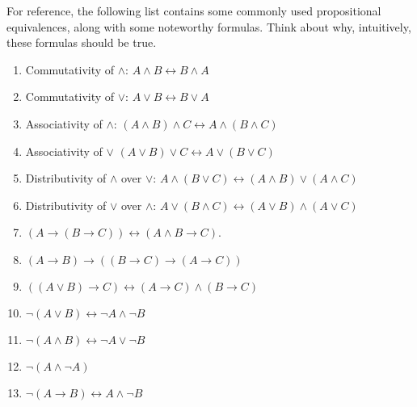 \documentclass[letterpaper,10pt,english]{sphinxmanual}
\begin{document}
\sphinxAtStartPar
For reference, the following list contains some commonly used propositional equivalences, along with some noteworthy formulas. Think about why, intuitively, these formulas should be true.
\begin{enumerate}
%
\item {} 
\sphinxAtStartPar
Commutativity of \(\wedge\): \(A \wedge B \leftrightarrow B \wedge A\)

\item {} 
\sphinxAtStartPar
Commutativity of \(\vee\): \(A \vee B \leftrightarrow B \vee A\)

\item {} 
\sphinxAtStartPar
Associativity of \(\wedge\): \((A \wedge B) \wedge C \leftrightarrow A \wedge (B \wedge C)\)

\item {} 
\sphinxAtStartPar
Associativity of \(\vee\) \((A \vee B) \vee C \leftrightarrow A \vee (B \vee C)\)

\item {} 
\sphinxAtStartPar
Distributivity of \(\wedge\) over \(\vee\): \(A \wedge (B \vee C) \leftrightarrow (A \wedge B) \vee (A \wedge C)\)

\item {} 
\sphinxAtStartPar
Distributivity of \(\vee\) over \(\wedge\): \(A \vee (B \wedge C) \leftrightarrow (A \vee B) \wedge (A \vee C)\)

\item {} 
\sphinxAtStartPar
\((A \to (B \to C)) \leftrightarrow (A \wedge B \to C)\).

\item {} 
\sphinxAtStartPar
\((A \to B) \to ((B \to C) \to (A \to C))\)

\item {} 
\sphinxAtStartPar
\(((A \vee B) \to C) \leftrightarrow (A \to C) \wedge (B \to C)\)

\item {} 
\sphinxAtStartPar
\(\neg (A \vee B) \leftrightarrow \neg A \wedge \neg B\)

\item {} 
\sphinxAtStartPar
\(\neg (A \wedge B) \leftrightarrow \neg A \vee \neg B\)

\item {} 
\sphinxAtStartPar
\(\neg (A \wedge \neg A)\)

\item {} 
\sphinxAtStartPar
\(\neg (A \to B) \leftrightarrow A \wedge \neg B\)


\end{enumerate}
\end{document}
